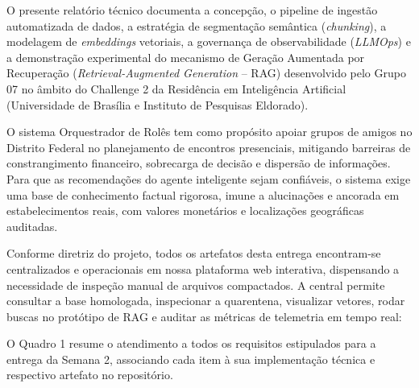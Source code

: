 \documentclass[11pt,a4paper]{article}
\begin{document}
O presente relatório técnico documenta a concepção, o pipeline de ingestão automatizada de dados, a estratégia de segmentação semântica (\textit{chunking}), a modelagem de \textit{embeddings} vetoriais, a governança de observabilidade (\textit{LLMOps}) e a demonstração experimental do mecanismo de Geração Aumentada por Recuperação (\textit{Retrieval-Augmented Generation} -- RAG) desenvolvido pelo Grupo 07 no âmbito do Challenge 2 da Residência em Inteligência Artificial (Universidade de Brasília e Instituto de Pesquisas Eldorado).

O sistema Orquestrador de Rolês tem como propósito apoiar grupos de amigos no Distrito Federal no planejamento de encontros presenciais, mitigando barreiras de constrangimento financeiro, sobrecarga de decisão e dispersão de informações. Para que as recomendações do agente inteligente sejam confiáveis, o sistema exige uma base de conhecimento factual rigorosa, imune a alucinações e ancorada em estabelecimentos reais, com valores monetários e localizações geográficas auditadas.

Conforme diretriz do projeto, todos os artefatos desta entrega encontram-se centralizados e operacionais em nossa plataforma web interativa, dispensando a necessidade de inspeção manual de arquivos compactados. A central permite consultar a base homologada, inspecionar a quarentena, visualizar vetores, rodar buscas no protótipo de RAG e auditar as métricas de telemetria em tempo real:

\begin{center}
\end{center}

O Quadro 1 resume o atendimento a todos os requisitos estipulados para a entrega da Semana 2, associando cada item à sua implementação técnica e respectivo artefato no repositório.
\end{document}
